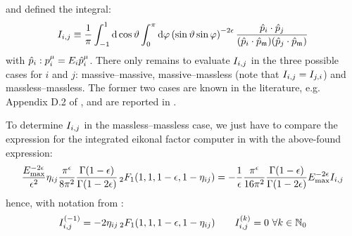 and defined the integral:
\begin{equation}
  I_{i,j} \equiv \frac{1}{\pi} \int_{-1}^1 \mathrm{d} \cos \vartheta \int_0^\pi \mathrm{d} \varphi \left( \sin \vartheta \sin \varphi \right)^{-2\epsilon} \frac{\hat{p}_i \cdot \hat{p}_j}{(\hat{p}_i \cdot \hat{p}_{\mathfrak{m}}) (\hat{p}_j \cdot \hat{p}_{\mathfrak{m}})}
  \label{eq:gen-int}
\end{equation}
with $ \hat{p}_i : p_i^\mu = E_i \hat{p}_i^\mu $. There only remains to evaluate $ I_{i,j} $ in the three possible cases for $ i $ and $ j $: massive--massive, massive--massless (note that $ I_{i,j} = I_{j,i} $) and massless--massless. The former two cases are known in the literature, e.g. Appendix D.2 of \cite{Behring-2020}, and are reported in .

To determine $ I_{i,j} $ in the massless--massless case, we just have to compare the expression for the integrated eikonal factor computer in  with the above-found expression:
\begin{equation*}
  \frac{E_\text{max}^{-2\epsilon}}{\epsilon^2} \eta_{ij} \frac{\pi^\epsilon}{8\pi^2} \frac{\Gamma(1-\epsilon)}{\Gamma(1-2\epsilon)} \,{_2F_1}(1,1,1-\epsilon,1-\eta_{ij}) = - \frac{1}{\epsilon} \frac{\pi^\epsilon}{16\pi^2} \frac{\Gamma(1-\epsilon)}{\Gamma(1-2\epsilon)} E_\text{max}^{-2\epsilon} I_{i,j}
\end{equation*}
hence, with notation from :
\begin{equation}
  I_{i,j}^{(-1)} = - 2 \eta_{ij} \,{_2F_1}(1,1,1-\epsilon,1-\eta_{ij})
  \qquad
  I_{i,j}^{(k)} = 0 \,\,\forall k \in \mathbb{N}_0
\end{equation}










